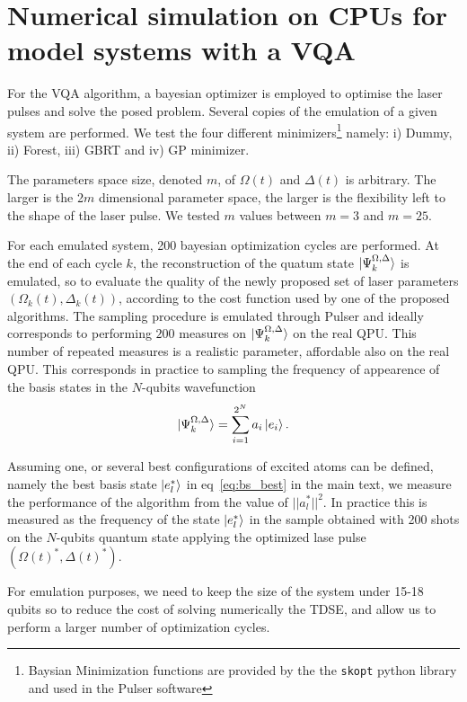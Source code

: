 \documentclass[fleqn,10pt]{wlscirep}
\begin{document}
\section{Numerical simulation on CPUs for model systems with a VQA}
\label{num-sim-support}

For the VQA algorithm, a bayesian optimizer is employed to optimise the laser pulses and solve the posed problem. Several copies of the emulation of a given system are performed. We test the four different minimizers\footnote{Baysian Minimization functions are provided by the the \texttt{skopt} python library and used in the Pulser software} namely: i) Dummy, ii) Forest, iii) GBRT and iv) GP minimizer.

The parameters space size, denoted $m$, of $\Omega(t)$ and $\Delta(t)$ is  arbitrary. The larger is the 2$m$ dimensional parameter space, the larger is the flexibility left to the shape of the laser pulse. We tested $m$ values between $m = 3$ and $m = 25$. 

For each emulated system, 200 bayesian optimization cycles are performed. At the end of each cycle $k$, the reconstruction of the quatum state $\ket{\Psi^{\Omega,\Delta}_k}$ is emulated, so to evaluate the quality of the newly proposed set of laser parameters $(\Omega_k(t), \Delta_k(t))$, according to the cost function used by one of the proposed algorithms. The sampling procedure is emulated through Pulser and ideally corresponds to performing $200$ measures on $\ket{\Psi^{\Omega,\Delta}_k}$ on the real QPU. This number of repeated measures is a realistic parameter, affordable also on the real QPU. This corresponds in practice to sampling the frequency of appearence of the basis states in the $N$-qubits wavefunction
\begin{equation}
    \ket{\Psi^{\Omega,\Delta}_k} = \sum_{i=1}^{2^N} a_i\ket{e_i}.
\end{equation}

Assuming one, or several best configurations of excited atoms can be defined, namely the best basis state $\ket{e^{*}_{l}}$ in eq~\ref{eq:bs_best} in the main text, we measure the performance of the algorithm from the value of $||a_l^{*} ||^2$. In practice this is measured as the frequency of the state $\ket{e^{*}_{l}}$ in the sample obtained with 200 shots on the $N$-qubits quantum state applying the optimized lase pulse $(\Omega(t)^*,\Delta(t)^*)$.

For emulation purposes, we need to keep the size of the system under 15-18 qubits so to reduce the cost of solving numerically the TDSE, and allow us to perform a larger number of optimization cycles. 
\end{document}
